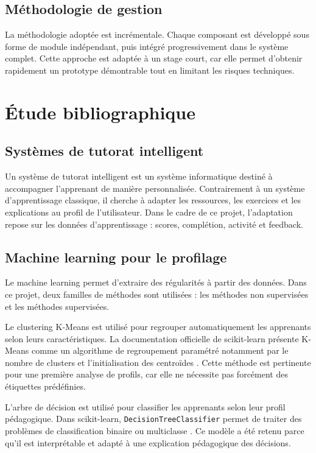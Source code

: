 \documentclass[12pt,a4paper]{report}
\begin{document}
\section{Méthodologie de gestion}

La méthodologie adoptée est incrémentale. Chaque composant est développé sous forme de module indépendant, puis intégré progressivement dans le système complet. Cette approche est adaptée à un stage court, car elle permet d'obtenir rapidement un prototype démontrable tout en limitant les risques techniques.

\chapter{Étude bibliographique}

\section{Systèmes de tutorat intelligent}

Un système de tutorat intelligent est un système informatique destiné à accompagner l'apprenant de manière personnalisée. Contrairement à un système d'apprentissage classique, il cherche à adapter les ressources, les exercices et les explications au profil de l'utilisateur. Dans le cadre de ce projet, l'adaptation repose sur les données d'apprentissage : scores, complétion, activité et feedback.

\section{Machine learning pour le profilage}

Le machine learning permet d'extraire des régularités à partir des données. Dans ce projet, deux familles de méthodes sont utilisées : les méthodes non supervisées et les méthodes supervisées.

Le clustering K-Means est utilisé pour regrouper automatiquement les apprenants selon leurs caractéristiques. La documentation officielle de scikit-learn présente K-Means comme un algorithme de regroupement paramétré notamment par le nombre de clusters et l'initialisation des centroïdes \cite{sklearn-kmeans}. Cette méthode est pertinente pour une première analyse de profils, car elle ne nécessite pas forcément des étiquettes prédéfinies.

L'arbre de décision est utilisé pour classifier les apprenants selon leur profil pédagogique. Dans scikit-learn, \texttt{DecisionTreeClassifier} permet de traiter des problèmes de classification binaire ou multiclasse \cite{sklearn-tree}. Ce modèle a été retenu parce qu'il est interprétable et adapté à une explication pédagogique des décisions.
\end{document}
